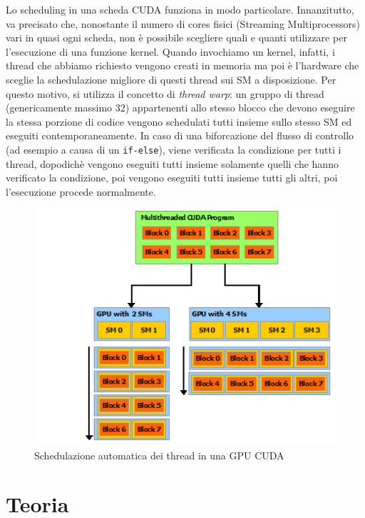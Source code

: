 \documentclass[12pt,a4paper]{book} %
\begin{document}
	Lo scheduling in una scheda CUDA funziona in modo particolare. Innanzitutto, va precisato che, nonostante il numero di cores fisici (Streaming Multiprocessors) vari in quasi ogni scheda, non è possibile scegliere quali e quanti utilizzare per l'esecuzione di una funzione kernel. Quando invochiamo un kernel, infatti, i thread che abbiamo richiesto vengono creati in memoria ma poi è l'hardware che sceglie la schedulazione migliore di questi thread sui SM a disposizione. Per questo motivo, si utilizza il concetto di \textit{thread warp}: un gruppo di thread (genericamente massimo 32) appartenenti allo stesso blocco che devono eseguire la stessa porzione di codice vengono schedulati tutti insieme sullo stesso SM ed eseguiti contemporaneamente. In caso di una biforcazione del flusso di controllo (ad esempio a causa di un \texttt{if-else}), viene verificata la condizione per tutti i thread, dopodichè vengono eseguiti tutti insieme solamente quelli che hanno verificato la condizione, poi vengono eseguiti tutti insieme tutti gli altri, poi l'esecuzione procede normalmente.
	
	\begin{figure}
		\centering
		\includegraphics[width=0.5\linewidth]{automatic-scalability}
		\caption{Schedulazione automatica dei thread in una GPU CUDA}
		\label{fig:automatic-scalability}
	\end{figure}
	
	\chapter{Teoria}
\end{document}
